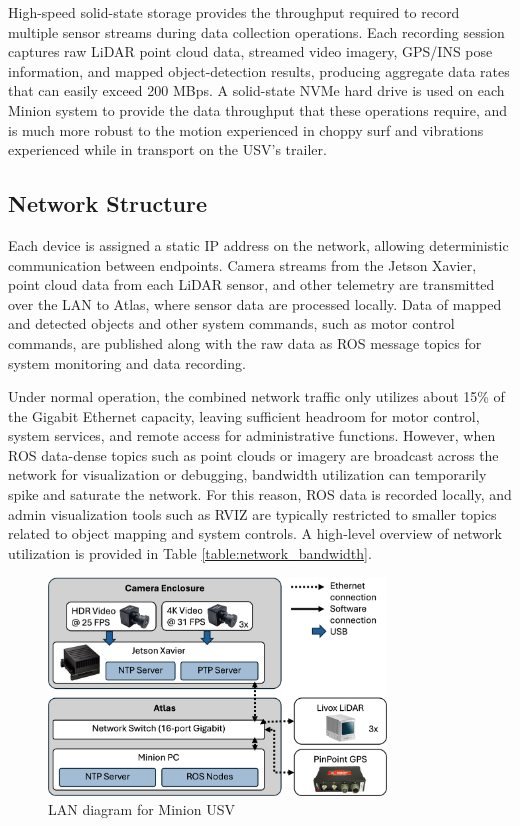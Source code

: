 \documentclass[../main.tex]{subfiles}
\begin{document}
High-speed solid-state storage provides the throughput required to record multiple sensor streams during data collection operations.
Each recording session captures raw \ac{LiDAR} point cloud data, streamed video imagery, GPS/INS pose information, and mapped object-detection results, producing aggregate data rates that can easily exceed 200 \ac{MBps}.
A solid-state NVMe hard drive is used on each Minion system to provide the data throughput that these operations require, and is much more robust to the motion experienced in choppy surf and vibrations experienced while in transport on the \ac{USV}'s trailer.


\subsection{Network Structure} \label{comp:network}

Each device is assigned a static IP address on the network, allowing deterministic communication between endpoints.
Camera streams from the Jetson Xavier, point cloud data from each LiDAR sensor, and other telemetry are transmitted over the LAN to Atlas, where sensor data are processed locally.
Data of mapped and detected objects and other system commands, such as motor control commands, are published along with the raw data as \ac{ROS} message topics for system monitoring and data recording.

Under normal operation, the combined network traffic only utilizes about 15\% of the Gigabit Ethernet capacity, 
leaving sufficient headroom for motor control, system services, and remote access for administrative functions.
However, when \ac{ROS} data-dense topics such as point clouds or imagery are broadcast across the network for visualization or debugging, bandwidth utilization can temporarily spike and saturate the network.
For this reason, ROS data is recorded locally, and admin visualization tools such as RVIZ are typically restricted to smaller topics related to object mapping and system controls.
A high-level overview of network utilization is provided in Table \ref{table:network_bandwidth}.

\begin{figure}[htbp]
\centering
\includegraphics[width=0.8\textwidth]{Images/network_diagram2.png}
\caption{LAN diagram for Minion USV}
\label{fig:network_diagram}
\end{figure}
\end{document}
